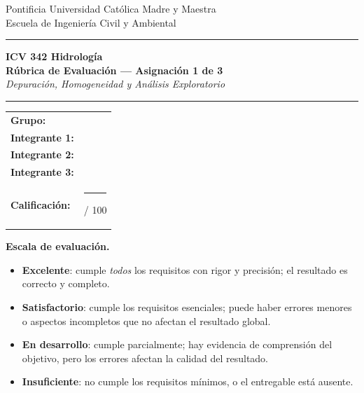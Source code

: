 \documentclass[11pt]{article}
\begin{document}
\begin{center}
  {\small\color{midgrey}
    Pontificia Universidad Católica Madre y Maestra\\
    Escuela de Ingeniería Civil y Ambiental}
  \vspace{0.9cm}
  {\color{medblue}\rule{\linewidth}{2pt}}\vspace{0.3cm}
  {\Large\bfseries\color{darkblue} ICV 342 Hidrología}\\[0.3em]
  {\large\bfseries\color{darkblue} Rúbrica de Evaluación --- Asignación 1 de 3}\\[0.2em]
  {\normalsize\itshape Depuración, Homogeneidad y Análisis Exploratorio}
  \vspace{0.3cm}
  {\color{medblue}\rule{\linewidth}{2pt}}
\end{center}
\vspace{0.4em}
\begin{center}
\begin{tabularx}{\textwidth}{lX}
\toprule
\textbf{Grupo:}        & \hrulefill \\[9pt]
\textbf{Integrante 1:} & \hrulefill \\[9pt]
\textbf{Integrante 2:} & \hrulefill \\[9pt]
\textbf{Integrante 3:} & \hrulefill \\[9pt]
\textbf{Calificación:} & \rule{2.5cm}{0.4pt}\;/ 100 \\
\bottomrule
\end{tabularx}
\end{center}
\vspace{0.5em}

\begin{infobox}
\textbf{Escala de evaluación.}
\begin{itemize}
  \item \textbf{Excelente}: cumple \emph{todos} los requisitos con rigor
    y precisión; el resultado es correcto y completo.
  \item \textbf{Satisfactorio}: cumple los requisitos esenciales; puede haber
    errores menores o aspectos incompletos que no afectan el resultado global.
  \item \textbf{En desarrollo}: cumple parcialmente; hay evidencia de
    comprensión del objetivo, pero los errores afectan la calidad del resultado.
  \item \textbf{Insuficiente}: no cumple los requisitos mínimos,
    o el entregable está ausente.
\end{itemize}
\end{infobox}
\end{document}
